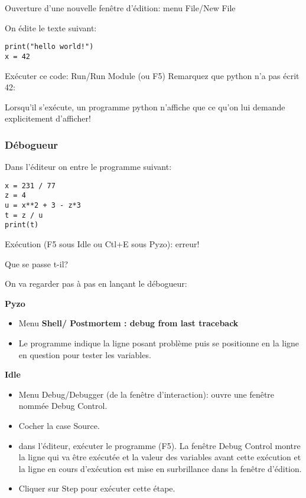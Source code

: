 Ouverture d'une nouvelle fenêtre d'édition: menu File/New File

On édite le texte suivant:
\begin{lstlisting}
print("hello world!")
x = 42
\end{lstlisting}

Exécuter ce code: Run/Run Module (ou F5)
Remarquez que python n'a pas écrit 42:

Lorsqu'il s'exécute, un programme python n'affiche que ce qu'on lui
demande explicitement d'afficher!

\subsubsection{Débogueur}

Dans l'éditeur on entre le programme suivant:
\begin{lstlisting}
x = 231 / 77
z = 4
u = x**2 + 3 - z*3
t = z / u
print(t)
\end{lstlisting}
Exécution (F5 sous Idle ou Ctl+E sous Pyzo): erreur!

Que se passe t-il?

On va regarder pas à pas en lançant le débogueur:
\begin{center}
\begin{minipage}[t]{0.45\textwidth}
\textbf{Pyzo}

\begin{itemize}
\item Menu \textbf{Shell/ Postmortem : debug from last traceback}

\item Le programme indique la ligne posant problème puis se positionne en la ligne en question pour tester les variables.
\end{itemize}
\end{minipage}
\vline
\begin{minipage}[t]{0.45\textwidth}
\textbf{Idle}

\begin{itemize}
\item Menu Debug/Debugger (de la fenêtre d'interaction): ouvre une fenêtre nommée
Debug Control. 
\item Cocher la case \og{}Source\fg{}.

\item dans l'éditeur, exécuter le programme (F5). La fenêtre Debug
Control montre la ligne qui va être exécutée et la valeur des
variables avant cette exécution et la ligne en cours d'exécution est
mise en surbrillance dans la fenêtre d'édition. 
\item Cliquer sur Step pour
exécuter cette étape.
\end{itemize}

\end{minipage}
\end{center}


